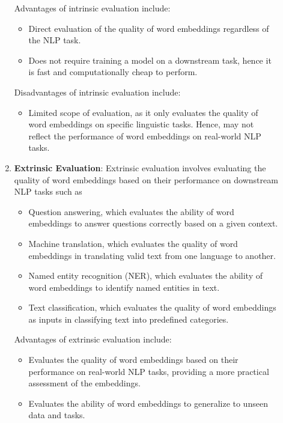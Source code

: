 \documentclass[12pt]{article}
\begin{document}
\begin{description}
\begin{enumerate}
    Advantages of intrinsic evaluation include:

    \begin{itemize}
      \item Direct evaluation of the quality of word embeddings regardless of the NLP task.
      \item Does not require training a model on a downstream task, hence it is fast and computationally cheap to perform.
    \end{itemize}

    Disadvantages of intrinsic evaluation include:

    \begin{itemize}
      \item Limited scope of evaluation, as it only evaluates the quality of word embeddings on specific linguistic tasks. Hence, may not reflect the performance of word 
      embeddings on real-world NLP tasks.
    \end{itemize}

  \item \textbf{Extrinsic Evaluation}: Extrinsic evaluation involves evaluating the quality of word embeddings based on their performance on downstream NLP tasks such as
  
  \begin{itemize}
    \item Question answering, which evaluates the ability of word embeddings to answer questions correctly based on a given context.
    \item Machine translation, which evaluates the quality of word embeddings in translating valid text from one language to another.
    \item Named entity recognition (NER), which evaluates the ability of word embeddings to identify named entities in text.
    \item Text classification, which evaluates the quality of word embeddings as inputs in classifying text into predefined categories.
  \end{itemize}

  Advantages of extrinsic evaluation include:

  \begin{itemize}
    \item Evaluates the quality of word embeddings based on their performance on real-world NLP tasks, providing a more practical assessment of the embeddings.
    \item Evaluates the ability of word embeddings to generalize to unseen data and tasks.
  \end{itemize}


\end{enumerate}
\end{description}
\end{document}

